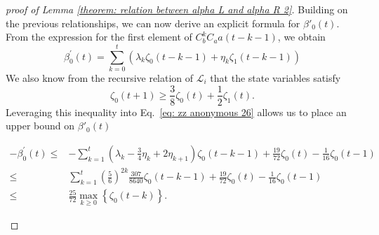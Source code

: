 \documentclass[showpacs,twocolumn,aps,prx,long bibliography,superscriptaddress,notitlepage]{revtex4-1}
\begin{document}
\begin{proof}[proof of Lemma \ref{theorem: relation between alpha L and alpha R 2}]
Building on the previous relationships, we can now derive an explicit formula for $\beta'_0(t)$. From the expression for the first element of $C_b^kC_aa(t-k-1)$, we obtain
\begin{equation}
    \beta_0^{\prime}(t)=\sum_{k=0}^t\left(\lambda_k \zeta_0(t-k-1)+\eta_k \zeta_1(t-k-1)\right)
    \label{eq: zz anonymous 26}
\end{equation}
We also know from the recursive relation of $\mathcal{L}_i$ that the state variables satisfy
\begin{equation}
\zeta_0(t+1) \geq \frac{3}{8} \zeta_0(t)+\frac{1}{2} \zeta_1(t).
\end{equation}
Leveraging this inequality into Eq.~\ref{eq: zz anonymous 26} allows us to place an upper bound on $\beta'_0(t)$
\begin{widetext}
    \begin{align}
-\beta_0^{\prime}(t) \leq & -\sum_{k=1}^t\left(\lambda_k-\frac{3}{4} \eta_k+2 \eta_{k+1}\right) \zeta_0(t-k-1)+ \frac{19}{72} \zeta_0(t) - \frac{1}{16}\zeta_0(t-1) \\
\leq & \sum_{k=1}^t\left(\frac{5}{6}\right)^{2 k} \frac{307}{8640} \zeta_0(t-k-1)+ \frac{19}{72} \zeta_0(t) - \frac{1}{16}\zeta_0(t-1) \\
\leq & \frac{25}{72} \max_{k \geq 0}\left\{\zeta_0(t-k)\right\}.
\end{align}
\end{widetext}

    
\end{proof}
\end{document}
